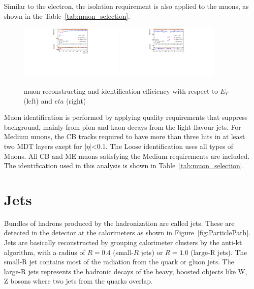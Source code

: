 Similar to the electron, the isolation requirement is also applied to the muons, as shown in the Table~\ref{tab:muon_selection}.
\begin{figure}[tbp]
\begin{center}
 \includegraphics[width=0.45\textwidth,keepaspectratio]{figures/Reconstruction/recoMuonpT}
 \includegraphics[width=0.45\textwidth,keepaspectratio]{figures/Reconstruction/recoMuonEta}
\caption{
muon reconstructing and identification efficiency with respect to $E_T$ (left) and $eta$ (right) \cite{MUON-2018-03}
}
\label{fig:recoMuon}
\end{center}
\end{figure}
Muon identification is performed by applying quality requirements that suppress background, mainly from pion and kaon decays from the light-flavour jets. 
For Medium muons, the CB tracks required to have more than three hits in at least two MDT layers exept for |$\eta$|<0.1.
The Loose identification uses all types of Muons. All CB and ME muons satisfying the Medium requirements are included. 
The identification used in this analysis is shown in Table~\ref{tab:muon_selection}.

\section{Jets}
Bundles of hadrons produced by the hadronization are called jets.
These are detected in the detector at the calorimeters as shown in Figure~\ref{fig:ParticlePath}.
Jets are basically reconstructed by grouping calorimeter clusters by the anti-kt algorithm\cite{Cacciari_2008}, with a radius of $R = 0.4$ (small-$R$ jets) or $R = 1.0$ (large-R jets). The small-R jet contains most of the radiation from the quark or gluon jets. The large-R jets represents the hadronic decays of the heavy, boosted objects like W, Z bosons where two jets from the quarks overlap.

